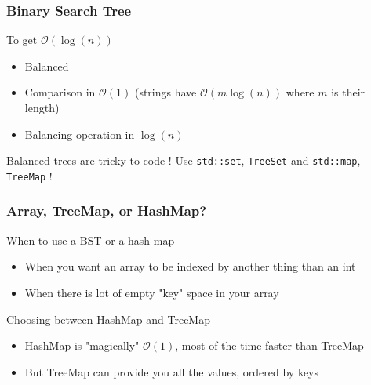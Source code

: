 \documentclass[10pt,svgnames,usenames,table]{beamer} %
\newcommand{\bigoh}{\mathcal{O}}
\begin{document}
\begin{frame}
  \frametitle{Binary Search Tree}
  \begin{center}
\end{center}
  \framebreak

  To get $\bigoh(\log(n))$
  \begin{itemize}
    \item Balanced
    \item Comparison in $\bigoh(1)$ (strings have $\bigoh(m\log(n))$ where $m$ is their length)
    \item Balancing operation in $\log(n)$
  \end{itemize}
  Balanced trees are tricky to code ! Use \lstinline|std::set|, \lstinline|TreeSet| and \lstinline|std::map|, \lstinline|TreeMap| !
\end{frame}

\begin{frame}
\frametitle{Array, TreeMap, or HashMap?}
\begin{block}{When to use a BST or a hash map}
    \begin{itemize}
      \item When you want an array to be indexed by another thing than an int %
      \item When there is lot of empty "key" space in your array %
    \end{itemize}
  \end{block}
  \begin{block}{Choosing between HashMap and TreeMap}
    \begin{itemize}
      \item HashMap is "magically" $\bigoh(1)$, most of the time faster than TreeMap
      \item But TreeMap can provide you all the values, ordered by keys
    \end{itemize}
  \end{block}
\end{frame}
\end{document}
